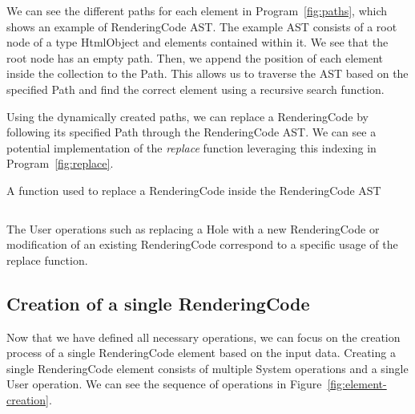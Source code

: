 We can see the different paths for each element in Program~\ref{fig:paths}, which shows an example of RenderingCode AST.
The example AST consists of a root node of a type HtmlObject and elements contained within it.
We see that the root node has an empty path.
Then, we append the position of each element inside the collection to the Path.
This allows us to traverse the AST based on the specified Path and find the correct element using a recursive search function.


Using the dynamically created paths, we can replace a RenderingCode by following its specified Path through the RenderingCode AST.
We can see a potential implementation of the \emph{replace} function leveraging this indexing in Program~\ref{fig:replace}.


\begin{listing}
	\caption {A function used to replace a RenderingCode inside the RenderingCode AST}
	\label{fig:replace}
	\begin{lstlisting}
  \end{lstlisting}
\end{listing}

The User operations such as replacing a Hole with a new RenderingCode or modification of an existing RenderingCode correspond to a specific usage of the replace function.

\subsection{Creation of a single RenderingCode}

Now that we have defined all necessary operations, we can focus on the creation process of a single RenderingCode element based on the input data.
Creating a single RenderingCode element consists of multiple System operations and a single User operation.
We can see the sequence of operations in Figure~\ref{fig:element-creation}.


